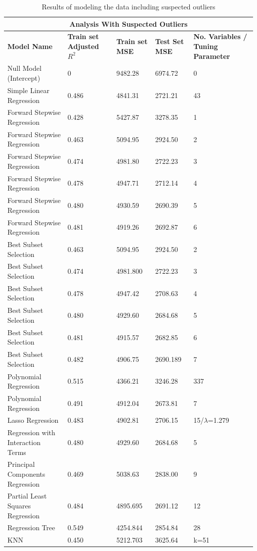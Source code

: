 \def\arraystretch{1.5}%
\begin{table}
	\centering
	\begin{tabular}{|p{6.2cm}||p{2cm}|p{2cm}|p{2cm}|p{2.57cm}|}
		\hline
		\multicolumn{5}{|c|}{Analysis With Suspected Outliers} \\
		\hline
			\textbf{\footnotesize Model Name} & \textbf{\footnotesize Train set Adjusted $R^2$} &\textbf{\footnotesize Train set MSE} & \textbf{\footnotesize Test Set MSE} & \textbf{\footnotesize No. Variables / Tuning Parameter}\\
			\hline
		Null Model (Intercept) & 0 & 9482.28 & 6974.72 & 0\\
		\hline
		Simple Linear Regression & 0.486 & 4841.31 & 2721.21 & 43\\
		\hline
		Forward Stepwise Regression & 0.428 & 5427.87 & 3278.35 & 1\\
		\hline
		Forward Stepwise Regression & 0.463 & 5094.95 & 2924.50 & 2\\
		\hline
		Forward Stepwise Regression & 0.474 & 4981.80 & 2722.23 & 3\\
		\hline
		Forward Stepwise Regression & 0.478 & 4947.71 & 2712.14 & 4\\
		\hline
		Forward Stepwise Regression & 0.480 & 4930.59 & 2690.39 & 5\\
		\hline
		Forward Stepwise Regression & 0.481 & 4919.26 & 2692.87 & 6\\
		\hline
		Best Subset Selection & 0.463 & 5094.95 & 2924.50 & 2\\
		\hline
		Best Subset Selection & 0.474 & 4981.800 & 2722.23 & 3\\
		\hline
		Best Subset Selection & 0.478  & 4947.42 & 2708.63 & 4\\
		\hline
		Best Subset Selection & 0.480 & 4929.60 & 2684.68 & 5\\
		\hline
		Best Subset Selection & 0.481 & 4915.57 & 2682.85 & 6\\
		\hline
		Best Subset Selection & 0.482 & 4906.75 & 2690.189 & 7\\
		\hline
		Polynomial Regression & 0.515 & 4366.21 & 3246.28 & 337\\
		\hline
		Polynomial Regression & 0.491 & 4912.04 & 2673.81 & 7\\
		\hline
		Lasso Regression & 0.483 & 4902.81 & 2706.15 & 15/$\lambda$=1.279\\
		\hline
		Regression with Interaction Terms & 0.480 & 4929.60 & 2684.68 & 5\\
		\hline
		Principal Components Regression & 0.469 & 5038.63 & 2838.00 & 9\\
		\hline
		Partial Least Squares Regression & 0.484 & 4895.695 & 2691.12 & 12\\
		\hline
		Regression Tree & 0.549 & 4254.844 & 2854.84 & 28\\
		\hline
		KNN & 0.450 & 5212.703 & 3625.64 & k=51\\
		\hline
	\end{tabular}
	\caption{Results of modeling the data including suspected outliers}
\end{table}
\break\hfill

